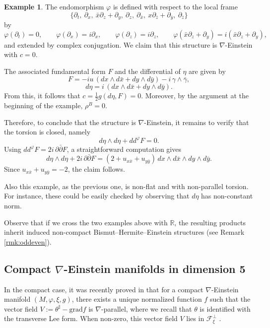 \documentclass{article}
\theoremstyle{definition}
\newtheorem{ex}[thm]{Example}
\newcommand{\R}{\mathbb{R}}
\renewcommand{\phi}{\varphi}
\numberwithin{equation}{section}
\begin{document}
\begin{ex}
The endomorphism \(\phi\) is defined with respect to the local frame
\[
\{\partial_t,\ \partial_x,\ \bar{x}\partial_z+\partial_y,\ \partial_z,\ \partial_{\bar{x}},\ x \partial_{\bar{z}}+\partial_{\bar{y}},\ \partial_{\bar{z}} \}
\]
by
\[
\phi(\partial_t)=0, \qquad
\phi(\partial_x)=i\partial_x, \qquad
\phi(\partial_z)=i\partial_z, \qquad
\phi(\bar{x}\partial_z+\partial_y)=i(\bar{x}\partial_z+\partial_y),
\]
and extended by complex conjugation. We claim that this structure is \(\nabla\)-Einstein with $c=0$.

The associated fundamental form \(F\) and the differential of \(\eta\) are given by
\[
F = -iu\,(dx \wedge d\bar{x} + dy \wedge d\bar{y}) - i\,\gamma \wedge \bar{\gamma},
\]
\[
d\eta = i\, (dx \wedge d\bar{x} + dy \wedge d\bar{y}).
\]
From this, it follows that \(c = \frac{1}{2} g(d\eta, F) = 0\).
Moreover, by the argument at the beginning of the example, \(\rho^B = 0\).

Therefore, to conclude that the structure is \(\nabla\)-Einstein, it remains to verify that the torsion is closed, namely
\[
d\eta \wedge d\eta + dd^\phi F = 0.
\]
Using \(dd^\phi F = 2i\,\partial\bar{\partial}F\), a straightforward computation gives
\[
d\eta \wedge d\eta + 2i\, \partial\bar{\partial}F
= (2 + u_{x\bar{x}} + u_{y\bar{y}})\, dx \wedge d\bar{x} \wedge dy \wedge d\bar{y}.
\]
Since \(u_{x\bar{x}} + u_{y\bar{y}} = -2\), the claim follows. \par
Also this example, as the previous one, is non-flat and with non-parallel torsion. For instance, these could be easily checked by observing that $d\eta$ has non-constant norm. 

\end{ex}

Observe that if we cross the two examples above with $\R$, the resulting products inherit induced non-compact Bismut--Hermite--Einstein structures (see Remark \ref{rmk:oddeven}).
\medskip
\subsection{Compact \texorpdfstring{$\nabla$}{}-Einstein manifolds in dimension 5}
In the compact case, it was recently proved in \cite{KS} that for a compact $\nabla$-Einstein manifold $(M,\phi,\xi,g)$, there exists a unique normalized function $f$ such that the vector field $V := \theta^\sharp - \mathrm{grad} f$ is $\nabla$-parallel, where we recall that $\theta$ is identified with the transverse Lee form. When non-zero, this vector field $V$ lies in $\mathcal{F}^\perp_\xi$ \cite{KS}.
 
\end{document}
